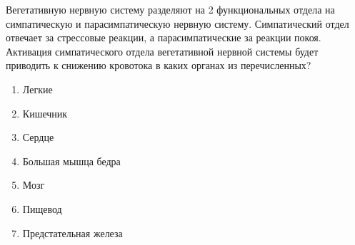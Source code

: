 
Вегетативную нервную систему разделяют на 2 функциональных отдела на 
симпатическую и парасимпатическую нервную систему. 
Симпатический отдел отвечает за стрессовые реакции, 
а парасимпатические за реакции покоя. Активация симпатического 
отдела вегетативной нервной системы будет приводить к снижению кровотока 
в каких органах из перечисленных?

\begin{enumerate}
    \item Легкие
    \item Кишечник
    \item Сердце
    \item Большая мышца бедра
    \item Мозг
    \item Пищевод
    \item Предстательная железа
\end{enumerate}

\explanationSection

